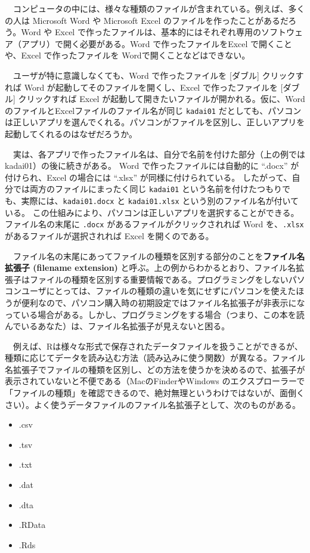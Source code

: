 \documentclass[
  a4paper,
  pandoc,
  ja=standard,
  jafont=haranoaji]{bxjsbook}
\providecommand{\tightlist}{%
  \setlength{\itemsep}{0pt}\setlength{\parskip}{0pt}}
\begin{document}
　コンピュータの中には、様々な種類のファイルが含まれている。例えば、多くの人は
Microsoft Word や Microsoft Excel
のファイルを作ったことがあるだろう。Word や Excel
で作ったファイルは、基本的にはそれぞれ専用のソフトウェア（アプリ）で開く必要がある。Word
で作ったファイルをExcel で開くことや、Excel で作ったファイルを
Wordで開くことなどはできない。

　ユーザが特に意識しなくても、Word で作ったファイルを {[}ダブル{]}
クリックすれば Word が起動してそのファイルを開くし、Excel
で作ったファイルを {[}ダブル{]} クリックすれば Excel
が起動して開きたいファイルが開かれる。仮に、Word
のファイルとExcelファイルのファイル名が同じ \texttt{kadai01}
だとしても、パソコンは正しいアプリを選んでくれる。パソコンがファイルを区別し、正しいアプリを起動してくれるのはなぜだろうか。

　実は、各アプリで作ったファイル名は、自分で名前を付けた部分（上の例では
kadai01）の後に続きがある。 Word で作ったファイルには自動的に ``.docx''
が付けられ、Excel の場合には ``.xlsx'' が同様に付けられている。
したがって、自分では両方のファイルにまったく同じ \texttt{kadai01}
という名前を付けたつもりでも、実際には、\texttt{kadai01.docx} と
\texttt{kadai01.xlsx} という別のファイル名が付いている。
この仕組みにより、パソコンは正しいアプリを選択することができる。ファイル名の末尾に
\texttt{.docx} があるファイルがクリックされれば Word を、\texttt{.xlsx}
があるファイルが選択されれば Excel を開くのである。

　ファイル名の末尾にあってファイルの種類を区別する部分のことを\textbf{ファイル名拡張子
(filename extension)}
と呼ぶ。上の例からわかるとおり、ファイル名拡張子はファイルの種類を区別する重要情報である。プログラミングをしないパソコンユーザにとっては、ファイルの種類の違いを気にせずにパソコンを使えたほうが便利なので、パソコン購入時の初期設定ではファイル名拡張子が非表示になっている場合がある。しかし、プログラミングをする場合（つまり、この本を読んでいるあなた）は、ファイル名拡張子が見えないと困る。

　例えば、Rは様々な形式で保存されたデータファイルを扱うことができるが、種類に応じてデータを読み込む方法（読み込みに使う関数）が異なる。ファイル名拡張子でファイルの種類を区別し、どの方法を使うかを決めるので、拡張子が表示されていないと不便である（MacのFinderやWindows
のエクスプローラーで「ファイルの種類」を確認できるので、絶対無理というわけではないが、面倒くさい）。よく使うデータファイルのファイル名拡張子として、次のものがある。

\begin{itemize}
\tightlist
\item
  .csv
\item
  .tsv
\item
  .txt
\item
  .dat
\item
  .dta
\item
  .RData
\item
  .Rds
\end{itemize}
\end{document}
